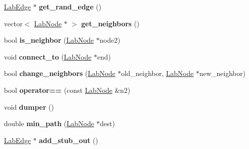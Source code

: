 \begin{DoxyCompactItemize}
\item 
\hypertarget{classelps_1_1_lab_node_a83724cb0af718b54b0b8dd7b865aeffa}{\hyperlink{classelps_1_1_lab_edge}{Lab\+Edge} $\ast$ {\bfseries get\+\_\+rand\+\_\+edge} ()}\label{classelps_1_1_lab_node_a83724cb0af718b54b0b8dd7b865aeffa}

\item 
\hypertarget{classelps_1_1_lab_node_a606f636148ffa126642511ae6b3a012a}{vector$<$ \hyperlink{classelps_1_1_lab_node}{Lab\+Node} $\ast$ $>$ {\bfseries get\+\_\+neighbors} ()}\label{classelps_1_1_lab_node_a606f636148ffa126642511ae6b3a012a}

\item 
\hypertarget{classelps_1_1_lab_node_aaf1209e0f2f231dd4d76b6f774a72988}{bool {\bfseries is\+\_\+neighbor} (\hyperlink{classelps_1_1_lab_node}{Lab\+Node} $\ast$node2)}\label{classelps_1_1_lab_node_aaf1209e0f2f231dd4d76b6f774a72988}

\item 
\hypertarget{classelps_1_1_lab_node_adaa284df82787ea7553ae20768570332}{void {\bfseries connect\+\_\+to} (\hyperlink{classelps_1_1_lab_node}{Lab\+Node} $\ast$end)}\label{classelps_1_1_lab_node_adaa284df82787ea7553ae20768570332}

\item 
\hypertarget{classelps_1_1_lab_node_a0270234d8b8ad3208fb00c4fb4fd84cd}{bool {\bfseries change\+\_\+neighbors} (\hyperlink{classelps_1_1_lab_node}{Lab\+Node} $\ast$old\+\_\+neighbor, \hyperlink{classelps_1_1_lab_node}{Lab\+Node} $\ast$new\+\_\+neighbor)}\label{classelps_1_1_lab_node_a0270234d8b8ad3208fb00c4fb4fd84cd}

\item 
\hypertarget{classelps_1_1_lab_node_a8ed1d89c69501c4a42f9bae8ac5f40cf}{bool {\bfseries operator==} (const \hyperlink{classelps_1_1_lab_node}{Lab\+Node} \&n2)}\label{classelps_1_1_lab_node_a8ed1d89c69501c4a42f9bae8ac5f40cf}

\item 
\hypertarget{classelps_1_1_lab_node_a1431b9fbac4a8e27ae5ba1abded62155}{void {\bfseries dumper} ()}\label{classelps_1_1_lab_node_a1431b9fbac4a8e27ae5ba1abded62155}

\item 
\hypertarget{classelps_1_1_lab_node_a252236c511fd5efe5e6e5c6ec56a7483}{double {\bfseries min\+\_\+path} (\hyperlink{classelps_1_1_lab_node}{Lab\+Node} $\ast$dest)}\label{classelps_1_1_lab_node_a252236c511fd5efe5e6e5c6ec56a7483}

\item 
\hypertarget{classelps_1_1_lab_node_af22a8ec73692670e5ec63d7b817a35e2}{\hyperlink{classelps_1_1_lab_edge}{Lab\+Edge} $\ast$ {\bfseries add\+\_\+stub\+\_\+out} ()}\label{classelps_1_1_lab_node_af22a8ec73692670e5ec63d7b817a35e2}


\end{DoxyCompactItemize}
